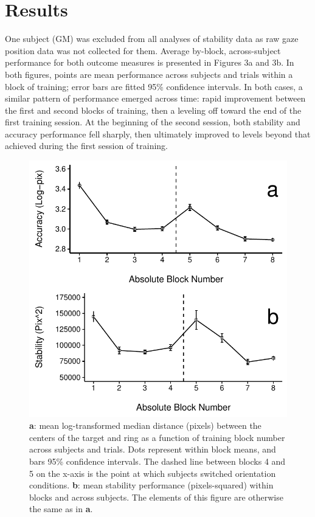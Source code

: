 \section{Results}

One subject (GM) was excluded from all analyses of stability data as raw gaze position data was not collected for them. Average by-block, across-subject performance for both outcome measures is presented in Figures 3a and 3b. In both figures, points are mean performance across subjects and trials within a block of training; error bars are fitted 95\% confidence intervals. In both cases, a similar pattern of performance emerged across time: rapid improvement between the first and second blocks of training, then a leveling off toward the end of the first training session. At the beginning of the second session, both stability and accuracy performance fell sharply, then ultimately improved to levels beyond that achieved during the first session of training.

\begin{figure}[htbp]
\centering
\includegraphics[width=.75\linewidth,height=.75\textheight,keepaspectratio]{figures/chapter_1/outcome_by_block.pdf}
\caption[Experiment 1: Outcomes by Block]{\textbf{a}: mean log-transformed median distance (pixels) between the centers of the target and ring as a function of training block number across subjects and trials. Dots represent within block means, and bars 95\% confidence intervals. The dashed line between blocks 4 and 5 on the x-axis is the point at which subjects switched orientation conditions. \textbf{b}: mean stability performance (pixels-squared) within blocks and across subjects. The elements of this figure are otherwise the same as in \textbf{a}.}\label{chap_1_outcome_by_block}
\end{figure}

